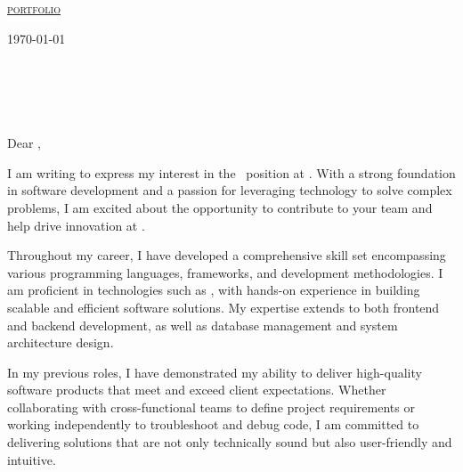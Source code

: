 \documentclass[11pt]{letter}
\newcommand{\addressHeading}[4]{
    {#1}\\
    {#2}\\
    {#3}\\
    {#4}\\
}
\newcommand{\greeting}{
    \vspace{-0.1in}Dear \hiringManager,
}
\begin{document}
\AddToShipoutPictureBG{%
\color{gr}
\AtPageUpperLeft{\rule[-1.3in]{\paperwidth}{1.3in}}
}

\def\headNameFontSize{28}
\def\headLinkFontSize{09}
\begin{center}
    {\fontsize{\headNameFontSize}{0}\selectfont\scshape \myname }
    
    \fontsize{\headLinkFontSize}{0}\selectfont\scshape \href{mailto:\myemail}{\faEnvelope\enspace \myemail}\hfill
    \fontsize{\headLinkFontSize}{0}\selectfont\scshape \href{https://linkedin.com/in/\mylinkedin}{\faLinkedinIn\enspace \mylinkedin}\hfill
    \fontsize{\headLinkFontSize}{0}\selectfont\scshape \href{\portfolio}{\faUser\enspace portfolio}\hfill
    \fontsize{\headLinkFontSize}{0}\selectfont\scshape \href{tel:\myphone}{\faPhone\enspace \myphone}\hfill
    \fontsize{\headLinkFontSize}{0}\selectfont\scshape \faMapMarker\enspace \mylocation
\end{center}

\vspace{0.2in}

\today
\\ \\
\addressHeading{\hiringManager}{\companyName}{\companyAddress}{\companyCity}

\greeting

I am writing to express my interest in the \possitionApplied\, position at \companyName.
With a strong foundation in software development and a passion for leveraging technology to solve complex problems,
I am excited about the opportunity to contribute to your team and help drive innovation at \companyName.

Throughout my career, I have developed a comprehensive skill set encompassing various programming languages, frameworks, and development methodologies.
I am proficient in technologies such as \companySkills, with hands-on experience in building scalable and efficient software solutions.
My expertise extends to both frontend and backend development, as well as database management and system architecture design.

In my previous roles, I have demonstrated my ability to deliver high-quality software products that meet and exceed client expectations.
Whether collaborating with cross-functional teams to define project requirements or working independently to troubleshoot and debug code,
I am committed to delivering solutions that are not only technically sound but also user-friendly and intuitive.
\end{document}
